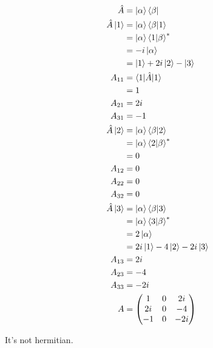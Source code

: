 \documentclass{article}
\begin{document}
\begin{enumerate}
        \begin{align*}
          \hat{A}         & = \ket{\alpha} \bra{\beta}              \\
          \hat{A} \ket{1} & = \ket{\alpha} \braket{\beta | 1}       \\
                          & = \ket{\alpha} \braket{1 | \beta}^*     \\
                          & = -i \ket{\alpha}                       \\
                          & = \ket{1} + 2 i \ket{2} - \ket{3}       \\
          A_{1 1}         & = \braket{1 | \hat{A} | 1}              \\
                          & = 1                                     \\
          A_{2 1}         & = 2 i                                   \\
          A_{3 1}         & = -1                                    \\
          \hat{A} \ket{2} & = \ket{\alpha} \braket{\beta | 2}       \\
                          & = \ket{\alpha} \braket{2 | \beta}^*     \\
                          & = 0                                     \\
          A_{1 2}         & = 0                                     \\
          A_{2 2}         & = 0                                     \\
          A_{3 2}         & = 0                                     \\
          \hat{A} \ket{3} & = \ket{\alpha} \braket{\beta | 3}       \\
                          & = \ket{\alpha} \braket{3 | \beta}^*     \\
                          & = 2 \ket{\alpha}                        \\
                          & = 2 i \ket{1} - 4 \ket{2} - 2 i \ket{3} \\
          A_{1 3}         & = 2 i                                   \\
          A_{2 3}         & = -4                                    \\
          A_{3 3}         & = -2 i                                  \\
          A               & = \begin{pmatrix}
                                1   & 0 & 2 i  \\
                                2 i & 0 & -4   \\
                                -1  & 0 & -2 i
                              \end{pmatrix}
        \end{align*}

        It's not hermitian.
\end{enumerate}
\end{document}

